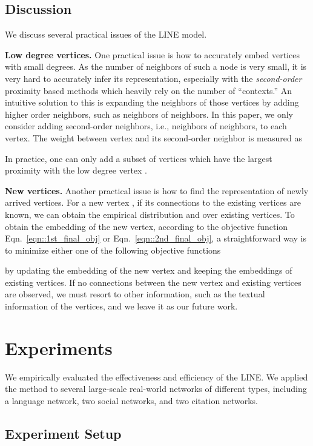 \documentclass{sig-alternate-2013}
\begin{document}
\subsection{Discussion}
We discuss several practical issues of the LINE model. 

\noindent \textbf{Low degree vertices.}
One practical issue is how to accurately embed vertices with small degrees. As the number of neighbors of such a node is very small, it is very hard to accurately infer its representation, especially with the \emph{second-order} proximity based methods which heavily rely on the number of  ``contexts.'' An intuitive solution to this is expanding the neighbors of those vertices by adding higher order neighbors, such as neighbors of neighbors. In this paper, we only consider adding second-order neighbors, i.e., neighbors of neighbors, to each vertex. The weight between vertex  and its second-order neighbor  is measured as
 
In practice, one can only add a subset of vertices  which have the largest proximity  with the low degree vertex .

\noindent \textbf{New vertices.}
Another practical issue is how to find the representation of newly arrived vertices. For a new vertex , if its connections to the existing vertices are known,  we can obtain the empirical distribution  and  over existing vertices. To obtain the embedding of the new vertex, according to the objective function Eqn.~\eqref{eqn::1st_final_obj} or Eqn.~\eqref{eqn::2nd_final_obj}, a straightforward way is to minimize either one of the following objective functions

by updating the embedding of the new vertex and keeping the embeddings of existing vertices. If no connections between the new vertex and existing vertices are observed, we must resort to other information, such as the textual information of the vertices, and we leave it as our future work.


\section{Experiments}
\label{sec::experiments}
We empirically evaluated the effectiveness and efficiency of the LINE. We applied the method to several large-scale real-world networks of different types, including a language network, two social networks, and two citation networks. 

\subsection{Experiment Setup}
\end{document}
